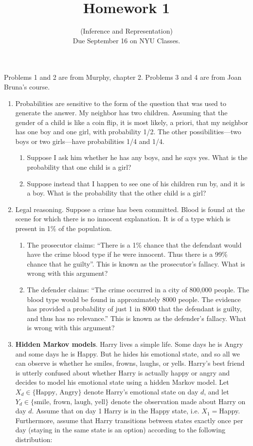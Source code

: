\documentclass[11pt]{article}
\date{}
\title{Homework 1}
\author{(Inference and Representation) 
\\ Due September 16 on NYU Classes.  }
\begin{document}
\maketitle
 
 Problems 1 and 2 are from Murphy, chapter 2. Problems 3 and 4 are from Joan Bruna's course.
\begin{enumerate}
\item  Probabilities are sensitive to the form of the question that was used to generate the answer. My neighbor has two children. Assuming that the gender of a child is like a coin flip, it is most likely, a priori, that my neighbor has one boy and one girl, with probability 1/2. The other possibilities—two boys or two girls—have probabilities 1/4 and 1/4.

\begin{enumerate}
\item Suppose I ask him whether he has any boys, and he says yes. What is the probability that one child is a girl?
\item Suppose instead that I happen to see one of his children run by, and it is a boy. What is the probability that the other child is a girl?
\end{enumerate}
\item Legal reasoning. Suppose a crime has been committed. Blood is found at the scene for which there is
no innocent explanation. It is of a type which is present in 1\% of the population.
\begin{enumerate}
\item The prosecutor claims: “There is a 1\% chance that the defendant would have the crime blood type if he were innocent. Thus there is a 99\% chance that he guilty”. This is known as the prosecutor’s fallacy. What is wrong with this argument?
\item The defender claims: “The crime occurred in a city of 800,000 people. The blood type would be found in approximately 8000 people. The evidence has provided a probability of just 1 in 8000 that the defendant is guilty, and thus has no relevance.” This is known as the defender’s fallacy. What is wrong with this argument?
\end{enumerate}

\item \textbf{Hidden Markov models}. Harry lives a simple life. Some days he is Angry and some days he is Happy. But he hides his emotional state, and so all we can observe is whether he smiles, frowns, laughs, or yells. Harry’s best friend is utterly confused about whether Harry is actually happy or angry and decides to model his emotional state using a hidden Markov model.
Let $X_d \in \{\text{Happy, Angry}\}$ denote Harry’s emotional state on day $d$, and let $Y_d\in \{ \text{smile, frown, laugh, yell}\}$ denote the observation made about Harry on day $d$. Assume that on day 1 Harry is in the Happy state, i.e. $X_1 = $Happy. Furthermore, assume that Harry transitions between states exactly once per day (staying in the same state is an option) according to the following distribution: 


\end{enumerate}
\end{document}
